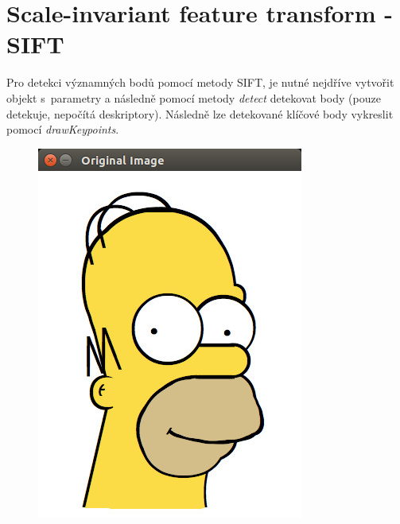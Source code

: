 \documentclass[12pt, a4paper]{article}
\begin{document}
\section{Scale-invariant feature transform - SIFT}

\par{Pro detekci významných bodů pomocí metody SIFT, je nutné nejdříve vytvořit objekt s~parametry a následně pomocí metody \textit{detect} detekovat body (pouze detekuje, nepočítá deskriptory). Následně lze detekované klíčové body vykreslit pomocí \textit{drawKeypoints}. }

\begin{figure}[!ht]
	\centering
	\begin{minipage}[t]{0.49\textwidth}
		\includegraphics[width = \textwidth]{./original.png}

\end{minipage}
\end{figure}
\end{document}
